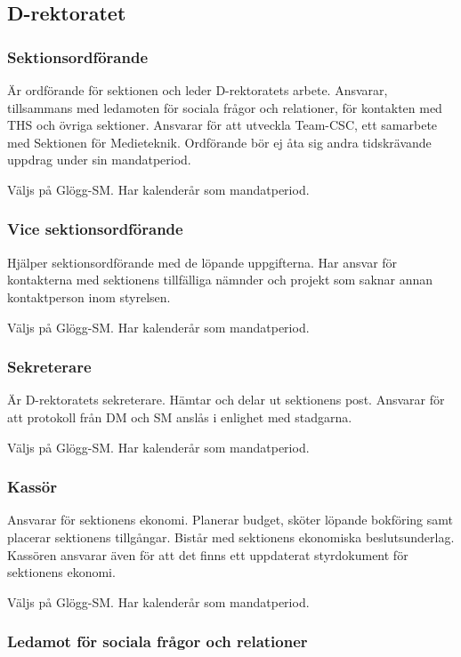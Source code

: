 \documentclass{dgovdoc}
\begin{document}
\subsection{D-rektoratet}

\subsubsection{Sektionsordförande}

Är ordförande för sektionen och leder D-rektoratets arbete. Ansvarar,
tillsammans med ledamoten för sociala frågor och relationer, för kontakten med
THS och övriga sektioner. Ansvarar för att utveckla Team-CSC, ett samarbete med
Sektionen för Medieteknik. Ordförande bör ej åta sig andra tidskrävande uppdrag
under sin mandatperiod.

Väljs på Glögg-SM. Har kalenderår som mandatperiod.

\subsubsection{Vice sektionsordförande}

Hjälper sektionsordförande med de löpande uppgifterna. Har ansvar för
kontakterna med sektionens tillfälliga nämnder och projekt som saknar annan
kontaktperson inom styrelsen.

Väljs på Glögg-SM. Har kalenderår som mandatperiod.

\subsubsection{Sekreterare}

Är D-rektoratets sekreterare. Hämtar och delar ut sektionens post. Ansvarar
för att protokoll från DM och SM anslås i enlighet med stadgarna.

Väljs på Glögg-SM. Har kalenderår som mandatperiod.

\subsubsection{Kassör}

Ansvarar för sektionens ekonomi. Planerar budget, sköter löpande bokföring
samt placerar sektionens tillgångar. Bistår med sektionens ekonomiska
beslutsunderlag. Kassören ansvarar även för att det finns ett uppdaterat
styrdokument för sektionens ekonomi.

Väljs på Glögg-SM. Har kalenderår som mandatperiod.

\subsubsection{Ledamot för sociala frågor och relationer}
\end{document}
